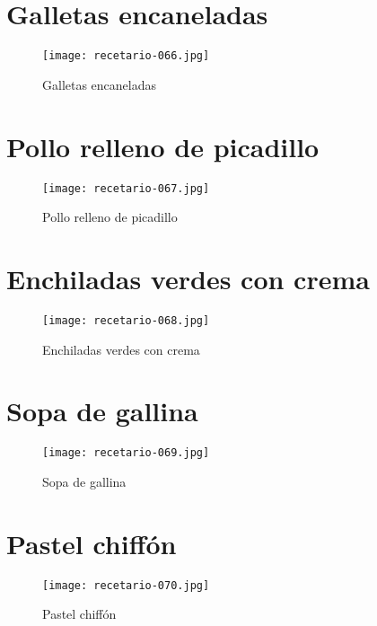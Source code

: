 \documentclass[12pt,letterpaper]{article}
\begin{document}
\newpage

\section{Galletas encaneladas}
  \begin{figure}[H]
    \vspace{2pt}
  \texttt{[image: recetario-066.jpg]}
    \caption{Galletas encaneladas}
    
  \end{figure}

\newpage

\section{Pollo relleno de picadillo}
  \begin{figure}[H]
    \vspace{2pt}
  \texttt{[image: recetario-067.jpg]}
    \caption{Pollo relleno de picadillo}
    
  \end{figure}

\newpage

\section{Enchiladas verdes con crema}
  \begin{figure}[H]
    \vspace{2pt}
  \texttt{[image: recetario-068.jpg]}
    \caption{Enchiladas verdes con crema}
    
  \end{figure}

\newpage

\section{Sopa de gallina}
  \begin{figure}[H]
    \vspace{2pt}
  \texttt{[image: recetario-069.jpg]}
    \caption{Sopa de gallina}
    
  \end{figure}

\newpage

\section{Pastel chiffón}
  \begin{figure}[H]
    \vspace{2pt}
  \texttt{[image: recetario-070.jpg]}
    \caption{Pastel chiffón}
    
  \end{figure}
\end{document}
